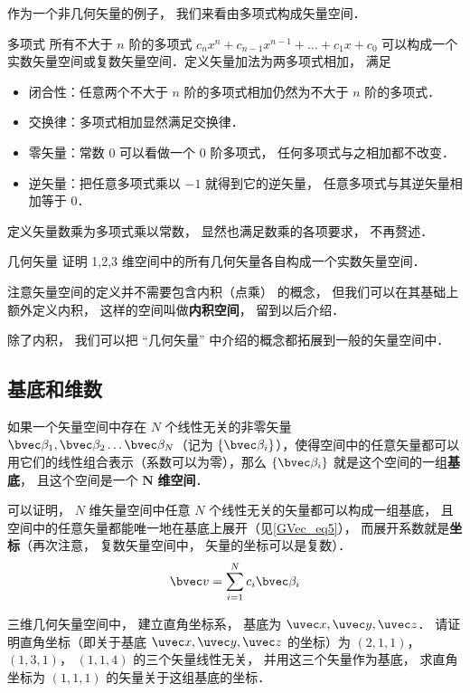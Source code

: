 作为一个非几何矢量的例子， 我们来看由多项式构成矢量空间．

\begin{example}{多项式}\label{LSpace_ex1}
所有不大于 $n$ 阶的多项式 $c_n x^n + c_{n-1} x^{n-1} + \dots + c_1 x + c_0$ 可以构成一个实数矢量空间或复数矢量空间．定义矢量加法为两多项式相加， 满足
\begin{itemize}
\item 闭合性：任意两个不大于 $n$ 阶的多项式相加仍然为不大于 $n$ 阶的多项式．
\item 交换律：多项式相加显然满足交换律．
\item 零矢量：常数 0 可以看做一个 0 阶多项式， 任何多项式与之相加都不改变．
\item 逆矢量：把任意多项式乘以 $-1$ 就得到它的逆矢量， 任意多项式与其逆矢量相加等于 0．
\end{itemize}
定义矢量数乘为多项式乘以常数， 显然也满足数乘的各项要求， 不再赘述．
\end{example}

\begin{exercise}{几何矢量}
证明 1,2,3 维空间中的所有几何矢量各自构成一个实数矢量空间．
\end{exercise}

注意矢量空间的定义并不需要包含内积（点乘） 的概念， 但我们可以在其基础上额外定义内积， 这样的空间叫做\textbf{内积空间}， 留到以后介绍．

除了内积， 我们可以把 “几何矢量” 中介绍的概念都拓展到一般的矢量空间中．

\subsection{基底和维数}

如果一个矢量空间中存在 $N$ 个线性无关的非零矢量 $\bvec \beta_1, \bvec \beta_2 \dots \bvec \beta_N$（记为 $\{\bvec \beta_i\}$），使得空间中的任意矢量都可以用它们的线性组合表示（系数可以为零），那么 $\{\bvec \beta_i\}$ 就是这个空间的一组\textbf{基底}， 且这个空间是一个 $\boldsymbol{N}$ \textbf{维空间}．

可以证明， $N$ 维矢量空间中任意 $N$ 个线性无关的矢量都可以构成一组基底， 且空间中的任意矢量都能唯一地在基底上展开（见\autoref{GVec_eq5}）， 而展开系数就是\textbf{坐标}（再次注意， 复数矢量空间中， 矢量的坐标可以是复数）．
\begin{equation}
\bvec v = \sum_{i=1}^N c_i \bvec \beta_i
\end{equation}

\begin{exercise}{}
三维几何矢量空间中， 建立直角坐标系， 基底为 $\uvec x, \uvec y, \uvec z$． 请证明直角坐标（即关于基底 $\uvec x, \uvec y, \uvec z$ 的坐标）为 $(2, 1, 1)$， $(1, 3, 1)$， $(1, 1, 4)$ 的三个矢量线性无关， 并用这三个矢量作为基底， 求直角坐标为 $(1, 1, 1)$ 的矢量关于这组基底的坐标．
\end{exercise}

